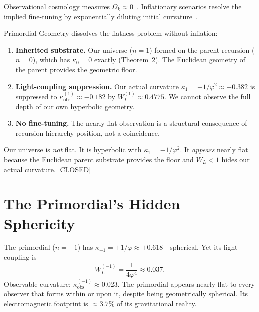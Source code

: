 \documentclass[prd,twocolumn,preprintnumbers,amsmath,amssymb]{revtex4-2}
\newcommand{\closed}{\textcolor{green!60!black}{[CLOSED]}}
\newcommand{\phig}{\varphi}
\newcommand{\WL}{W_{L}}
\newcommand{\kobs}{\kappa_{\mathrm{obs}}}
\begin{document}
Observational cosmology measures $\Omega_k \approx 0$~\cite{Planck2020}.
Inflationary scenarios resolve the implied fine-tuning by exponentially
diluting initial curvature~\cite{Guth1981}.

Primordial Geometry dissolves the flatness problem without inflation:

\begin{enumerate}
  \item \textbf{Inherited substrate.}  Our universe ($n=1$) formed on the
        parent recursion ($n=0$), which has $\kappa_0 = 0$ exactly (Theorem~2).
        The Euclidean geometry of the parent provides the geometric floor.

  \item \textbf{Light-coupling suppression.}  Our actual curvature $\kappa_1 =
        -1/\phig^2 \approx -0.382$ is suppressed to $\kobs^{(1)} \approx
        -0.182$ by $\WL^{(1)} \approx 0.4775$.  We cannot observe the full
        depth of our own hyperbolic geometry.

  \item \textbf{No fine-tuning.}  The nearly-flat observation is a structural
        consequence of recursion-hierarchy position, not a coincidence.
\end{enumerate}

Our universe is \emph{not} flat.  It is hyperbolic with $\kappa_1 = -1/\phig^2$.
It \emph{appears} nearly flat because the Euclidean parent substrate provides
the floor and $\WL < 1$ hides our actual curvature.  \closed

\section{The Primordial's Hidden Sphericity}
\label{sec:primordial}

The primordial ($n=-1$) has $\kappa_{-1} = +1/\phig \approx +0.618$---spherical.
Yet its light coupling is
\begin{equation}
  \WL^{(-1)} = \frac{1}{4\phig^4} \approx 0.037.
  \label{eq:WLprim}
\end{equation}
Observable curvature: $\kobs^{(-1)} \approx 0.023$.  The primordial appears
nearly flat to every observer that forms within or upon it, despite being
geometrically spherical.  Its electromagnetic footprint is $\approx 3.7\%$ of
its gravitational reality.
\end{document}
